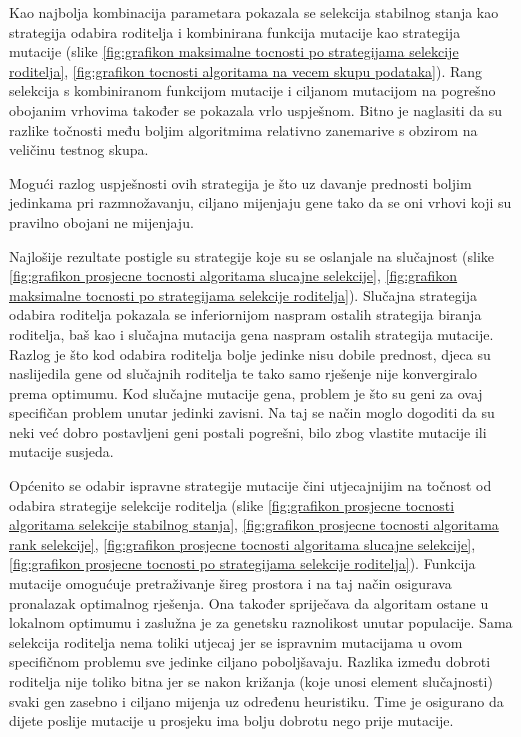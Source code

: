 \documentclass[times, utf8, zavrsni, numeric]{fer}
\begin{document}
Kao najbolja kombinacija parametara pokazala se selekcija stabilnog stanja kao strategija odabira roditelja i kombinirana funkcija mutacije kao strategija mutacije (slike \ref{fig:grafikon maksimalne tocnosti po strategijama selekcije roditelja}, \ref{fig:grafikon tocnosti algoritama na vecem skupu podataka}). Rang selekcija s kombiniranom funkcijom mutacije i ciljanom mutacijom na pogrešno obojanim vrhovima također se pokazala vrlo uspješnom. Bitno je naglasiti da su razlike točnosti među boljim algoritmima relativno zanemarive s obzirom na veličinu testnog skupa. 

Mogući razlog uspješnosti ovih strategija je što uz davanje prednosti boljim jedinkama pri razmnožavanju, ciljano mijenjaju gene tako da se oni vrhovi koji su pravilno obojani ne mijenjaju.

Najlošije rezultate postigle su strategije koje su se oslanjale na slučajnost (slike \ref{fig:grafikon prosjecne tocnosti algoritama slucajne selekcije}, \ref{fig:grafikon maksimalne tocnosti po strategijama selekcije roditelja}). Slučajna strategija odabira roditelja pokazala se inferiornijom naspram ostalih strategija biranja roditelja, baš kao i slučajna mutacija gena naspram ostalih strategija mutacije. Razlog je što kod odabira roditelja bolje jedinke nisu dobile prednost, djeca su naslijedila gene od slučajnih roditelja te tako samo rješenje nije konvergiralo prema optimumu. Kod slučajne mutacije gena, problem je što su geni za ovaj specifičan problem unutar jedinki zavisni. Na taj se način moglo dogoditi da su neki već dobro postavljeni geni postali pogrešni, bilo zbog vlastite mutacije ili mutacije susjeda.

Općenito se odabir ispravne strategije mutacije čini utjecajnijim na točnost od odabira strategije selekcije roditelja (slike \ref{fig:grafikon prosjecne tocnosti algoritama selekcije stabilnog stanja}, \ref{fig:grafikon prosjecne tocnosti algoritama rank selekcije}, \ref{fig:grafikon prosjecne tocnosti algoritama slucajne selekcije},  \ref{fig:grafikon prosjecne tocnosti po strategijama selekcije roditelja}). Funkcija mutacije omogućuje pretraživanje šireg prostora i na taj način osigurava pronalazak optimalnog rješenja. Ona također spriječava da algoritam ostane u lokalnom optimumu i zaslužna je za genetsku raznolikost unutar populacije. Sama selekcija roditelja nema toliki utjecaj jer se ispravnim mutacijama u ovom specifičnom problemu sve jedinke ciljano poboljšavaju. Razlika između dobroti roditelja nije toliko bitna jer se nakon križanja (koje unosi element slučajnosti) svaki gen zasebno i ciljano mijenja uz određenu heuristiku. Time je osigurano da dijete poslije mutacije u prosjeku ima bolju dobrotu nego prije mutacije.  
\end{document}

